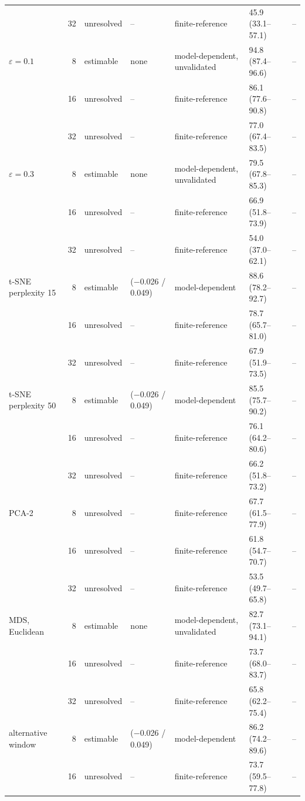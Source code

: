 \documentclass[11pt]{article}
\begin{document}
{\begin{longtable}{>{\raggedright\arraybackslash}p{3.0cm}rl>{\raggedright\arraybackslash}p{2.3cm}>{\raggedright\arraybackslash}p{2.1cm}ll}
 & 32 & unresolved & -- & finite-reference & 45.9 (33.1--57.1) & -- \\
\addlinespace
$\varepsilon=0.1$ & 8 & estimable & none & model-dependent, unvalidated & 94.8 (87.4--96.6) & -- \\
 & 16 & unresolved & -- & finite-reference & 86.1 (77.6--90.8) & -- \\
 & 32 & unresolved & -- & finite-reference & 77.0 (67.4--83.5) & -- \\
\addlinespace
$\varepsilon=0.3$ & 8 & estimable & none & model-dependent, unvalidated & 79.5 (67.8--85.3) & -- \\
 & 16 & unresolved & -- & finite-reference & 66.9 (51.8--73.9) & -- \\
 & 32 & unresolved & -- & finite-reference & 54.0 (37.0--62.1) & -- \\
\addlinespace
t-SNE perplexity 15 & 8 & estimable & 3 ($-$0.026 / 0.049) & model-dependent & 88.6 (78.2--92.7) & -- \\
 & 16 & unresolved & -- & finite-reference & 78.7 (65.7--81.0) & -- \\
 & 32 & unresolved & -- & finite-reference & 67.9 (51.9--73.5) & -- \\
\addlinespace
t-SNE perplexity 50 & 8 & estimable & 3 ($-$0.026 / 0.049) & model-dependent & 85.5 (75.7--90.2) & -- \\
 & 16 & unresolved & -- & finite-reference & 76.1 (64.2--80.6) & -- \\
 & 32 & unresolved & -- & finite-reference & 66.2 (51.8--73.2) & -- \\
\addlinespace
PCA-2 & 8 & unresolved & -- & finite-reference & 67.7 (61.5--77.9) & -- \\
 & 16 & unresolved & -- & finite-reference & 61.8 (54.7--70.7) & -- \\
 & 32 & unresolved & -- & finite-reference & 53.5 (49.7--65.8) & -- \\
\addlinespace
MDS, Euclidean & 8 & estimable & none & model-dependent, unvalidated & 82.7 (73.1--94.1) & -- \\
 & 16 & unresolved & -- & finite-reference & 73.7 (68.0--83.7) & -- \\
 & 32 & unresolved & -- & finite-reference & 65.8 (62.2--75.4) & -- \\
\addlinespace
alternative window & 8 & estimable & 3 ($-$0.026 / 0.049) & model-dependent & 86.2 (74.2--89.6) & -- \\
 & 16 & unresolved & -- & finite-reference & 73.7 (59.5--77.8) & -- \\

\end{longtable}}
\end{document}
